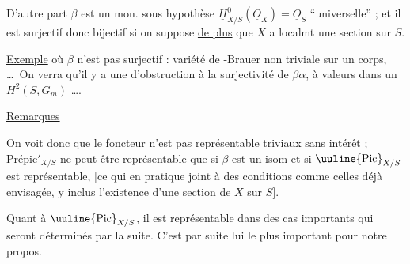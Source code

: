 
D'autre part $\beta$ est un mon. sous  hypothèse $\underline H^0_{X/S}(\underline O_X)=\underline O_S$ ``universelle'' ; et il est surjectif donc bijectif si on suppose \uline{de plus} que  $X$ a localmt une section sur $S$.

\uline{Exemple} où $\beta$ n'est pas surjectif : variété de -Brauer non triviale sur un corps, \ldots\ On verra qu'il y a une  d'obstruction à la surjectivité de $\beta\alpha$, à valeurs dans un $H^2(S,G_m)$ \ldots.

\uline{Remarques}

On voit donc que le foncteur  n'est pas représentable   triviaux sans intérêt ; $\mathrm{Prépic}'_{X/S}$ ne peut être représentable que si $\beta$ est un isom et si $\text{\uuline{Pic}}_{X/S}$ est représentable,  [ce qui en pratique joint à des conditions comme celles déjà envisagée, y inclus l'existence d'une section de $X$ sur $S$].

Quant à $\text{\uuline{Pic}}_{X/S}$, il est représentable dans des cas  importants qui seront déterminés par la suite. C'est par suite lui le plus important pour notre propos.

